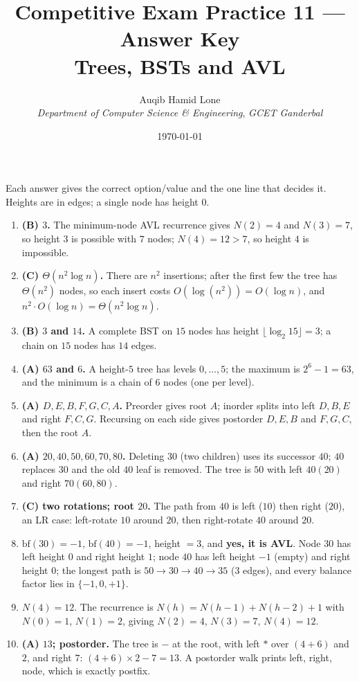 \documentclass[11pt]{article}
\title{Competitive Exam Practice 11 --- Answer Key\\\large Trees, BSTs and AVL}
\author{Auqib Hamid Lone\\[0.3em]
  \emph{Department of Computer Science \& Engineering}, \emph{GCET Ganderbal}}
\date{\today}
\begin{document}
\maketitle

\noindent Each answer gives the correct option/value and the one line that decides it. Heights are in edges; a single node has height $0$.

\begin{enumerate}
\item[\textbf{Q1}] \textbf{(B) $3$.} The minimum-node AVL recurrence gives $N(2)=4$ and $N(3)=7$, so height $3$ is possible with $7$ nodes; $N(4)=12>7$, so height $4$ is impossible.

\item[\textbf{Q2}] \textbf{(C) $\Theta(n^{2}\log n)$.} There are $n^{2}$ insertions; after the first few the tree has $\Theta(n^{2})$ nodes, so each insert costs $O(\log(n^{2}))=O(\log n)$, and $n^{2}\cdot O(\log n)=\Theta(n^{2}\log n)$.

\item[\textbf{Q3}] \textbf{(B) $3$ and $14$.} A complete BST on $15$ nodes has height $\lfloor\log_{2}15\rfloor=3$; a chain on $15$ nodes has $14$ edges.

\item[\textbf{Q4}] \textbf{(A) $63$ and $6$.} A height-$5$ tree has levels $0,\dots,5$; the maximum is $2^{6}-1=63$, and the minimum is a chain of $6$ nodes (one per level).

\item[\textbf{Q5}] \textbf{(A) $D,E,B,F,G,C,A$.} Preorder gives root $A$; inorder splits into left $D,B,E$ and right $F,C,G$. Recursing on each side gives postorder $D,E,B$ and $F,G,C$, then the root $A$.

\item[\textbf{Q6}] \textbf{(A) $20,40,50,60,70,80$.} Deleting $30$ (two children) uses its successor $40$; $40$ replaces $30$ and the old $40$ leaf is removed. The tree is $50$ with left $40(20)$ and right $70(60,80)$.

\item[\textbf{Q7}] \textbf{(C) two rotations; root $20$.} The path from $40$ is left ($10$) then right ($20$), an LR case: left-rotate $10$ around $20$, then right-rotate $40$ around $20$.

\item[\textbf{Q8}] $\mathrm{bf}(30)=-1$, $\mathrm{bf}(40)=-1$, height $=3$, and \textbf{yes, it is AVL}. Node $30$ has left height $0$ and right height $1$; node $40$ has left height $-1$ (empty) and right height $0$; the longest path is $50\to30\to40\to35$ ($3$ edges), and every balance factor lies in $\{-1,0,+1\}$.

\item[\textbf{Q9}] $N(4)=12$. The recurrence is $N(h)=N(h-1)+N(h-2)+1$ with $N(0)=1$, $N(1)=2$, giving $N(2)=4$, $N(3)=7$, $N(4)=12$.

\item[\textbf{Q10}] \textbf{(A) $13$; postorder.} The tree is $-$ at the root, with left $*$ over $(4+6)$ and $2$, and right $7$: $(4+6)\times2-7=13$. A postorder walk prints left, right, node, which is exactly postfix.
\end{enumerate}
\end{document}
